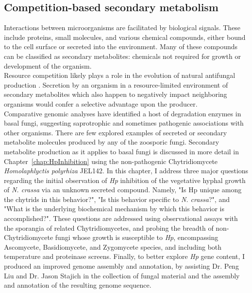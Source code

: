 \subsection{Competition-based secondary metabolism}
Interactions between microorganisms are facilitated by biological signals. These include proteins, small molecules, and various chemical compounds, either bound to the cell surface or secreted into the environment. Many of these compounds can be classified as secondary metabolites: chemicals not required for growth or development of the organism.\\
\indent Resource competition likely plays a role in the evolution of natural antifungal production \cite{Vicente2003}. Secretion by an organism in a resource-limited environment of secondary metabolites which also happen to negatively impact neighboring organisms would confer a selective advantage upon the producer. \\
\indent Comparative genomic analyses have identified a host of degradation enzymes in basal fungi, suggesting saprotrophic and sometimes pathogenic associations with other organisms. There are few explored examples of secreted or secondary metabolite molecules produced by any of the zoosporic fungi. 
\indent Secondary metabolite production as it applies to basal fungi is discussed in more detail in Chapter~\ref{chap:HpInhibition} using the non-pathogenic Chytridiomycete \textit{Homolaphlyctis polyrhiza} JEL142. In this chapter, I address three major questions regarding the initial observation of \textit{Hp} inhibition of the vegetative hyphal growth of \textit{N. crassa} via an unknown secreted compound. Namely, "Is Hp unique among the chytrids in this behavior?", "Is this behavior specific to \textit{N. crassa}?", and "What is the underlying biochemical mechanism by which this behavior is accomplished?". These questions are addressed using observational assays with the sporangia of related Chytridiomycetes, and probing the breadth of non-Chytridiomycete fungi whose growth is susceptible to \textit{Hp}, encompassing Ascomycete, Basidiomycete, and Zygomycete species, and including both temperature and proteinase screens. Finally, to better explore \textit{Hp} gene content, I produced an improved genome assembly and annotation, by assisting Dr. Peng Liu and Dr. Jason Stajich in the collection of fungal material and the assembly and annotation of the resulting genome sequence.\\
